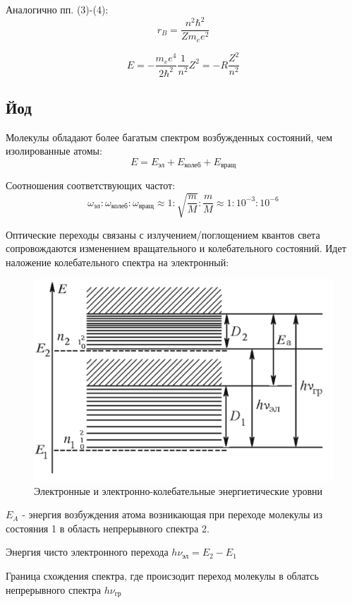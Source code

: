 \documentclass[a4paper]{article}
\begin{document}
Аналогично пп. (3)-(4):
\begin{equation}
     r_B = \frac{n^2 \hbar^2}{Z m_e e^2}
\end{equation}

\begin{equation}
    E = -\frac{m_e e^4}{2 \hbar^2} \frac{1}{n^2} Z^2 = -R \frac{Z^2}{n^2}
\end{equation}

\subsection{Йод}

Молекулы обладают более багатым спектром возбужденных состояний, чем изолированные атомы:
$$E = E_{\text{эл}} + E_{\text{колеб}} + E_{\text{вращ}}$$

Соотношения соответствующих частот:
$$\omega_{\text{эл}} : \omega_{\text{колеб}}: \omega_{\text{вращ}} \approx 1 : \sqrt{
    \frac{m}{M}} : \frac{m}{M} \approx 1 : 10^{-3} : 10^{-6}
$$

Оптические переходы связаны с излучением/поглощением квантов света сопровождаются изменением вращательного
и колебательного состояний. Идет наложение колебательного спектра на электронный:

\begin{figure}[H]
    \begin{center}
    \includegraphics[scale = 0.3]{p4.png}
    \caption{Электронные и электронно-колебательные энергиетические уровни}
    \label{p4}
    \end{center}
\end{figure}

$E_A$ - энергия возбуждения атома возникающая при переходе молекулы из состояния 1 в область 
непрерывного спектра 2. \par
Энергия чисто электронного перехода $h\nu_{\text{эл}} = E_2 - E_1$\par
Граница схождения спектра, где происзодит переход молекулы в облатсь непрерывного спектра $h\nu_{\text{гр}}$\par
\end{document}
